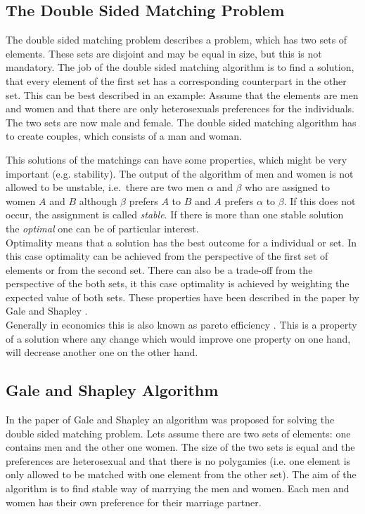 \label{theory}
\subsection{The Double Sided Matching Problem}
The double sided matching problem describes a problem, which has two sets of elements.
These sets are disjoint and may be equal in size, but this is not mandatory.
The job of the double sided matching algorithm is to find a solution, that every element of the first set has a corresponding counterpart in the other set. This can be best described in an example:
Assume that the elements are men and women and that there are only heterosexuals preferences for the individuals.
The two sets are now male and female.
The double sided matching algorithm has to create couples, which consists of a man and woman.

This solutions of the matchings can have some properties, which might be very important (e.g. stability).
The output of the algorithm of men and women is not allowed to be unstable, i.e.\ there are two men $\alpha$ and $\beta$ who are assigned to women $A$ and $B$ although $\beta$ prefers $A$ to $B$ and $A$ prefers $\alpha$ to $\beta$.
If this does not occur, the assignment is called \textit{stable}.
If there is more than one stable solution the \textit{optimal} one can be of particular interest.\\ 
Optimality means that a solution has the best outcome for a individual or set.
In this case optimality can be achieved from the perspective of the first set of elements or from the second set.
There can also be a trade-off from the perspective of the both sets, it this case optimality is achieved by weighting the expected value of both sets.
These properties have been described in the paper by Gale and Shapley \cite{gale62a}.\\
Generally in economics this is also known as pareto efficiency \cite[p. 46]{9780199297818}. 
This is a property of a solution where any change which would improve one property on one hand, will decrease another one on the other hand.


\subsection{Gale and Shapley Algorithm}

In the paper of Gale and Shapley \cite{gale62a} an algorithm was proposed for solving the double sided matching problem.
Lets assume there are two sets of elements: one contains men and the other one women.
The size of the two sets is equal and the preferences are heterosexual and that there is no polygamies (i.e. one element is only allowed to be matched with one element from the other set).
The aim of the algorithm is to find stable way of marrying the men and women.
Each men and women has their own preference for their marriage partner.

